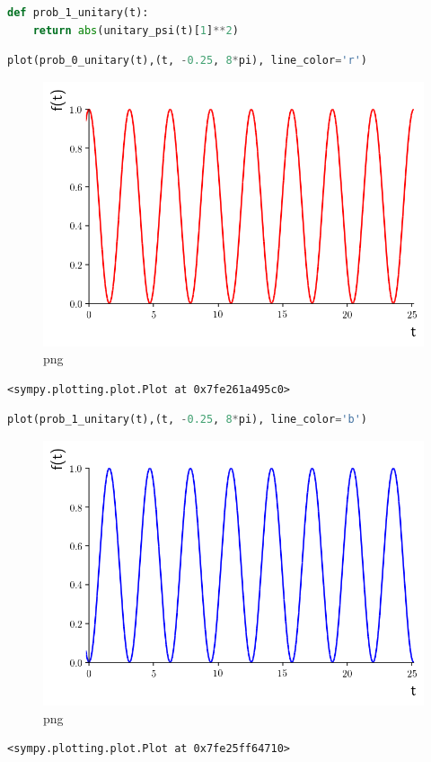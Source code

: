 \begin{lstlisting}[language=Python]
def prob_1_unitary(t):
    return abs(unitary_psi(t)[1]**2)
\end{lstlisting}

\begin{lstlisting}[language=Python]
plot(prob_0_unitary(t),(t, -0.25, 8*pi), line_color='r')
\end{lstlisting}

\begin{figure}
\centering
\includegraphics[width=0.6\linewidth]{output_41_0.png}
\caption[]{png}
\end{figure}

\begin{lstlisting}
<sympy.plotting.plot.Plot at 0x7fe261a495c0>
\end{lstlisting}

\begin{lstlisting}[language=Python]
plot(prob_1_unitary(t),(t, -0.25, 8*pi), line_color='b')
\end{lstlisting}

\begin{figure}
\centering
\includegraphics[width=0.6\linewidth]{output_42_0.png}
\caption[]{png}
\end{figure}

\begin{lstlisting}
<sympy.plotting.plot.Plot at 0x7fe25ff64710>
\end{lstlisting}

